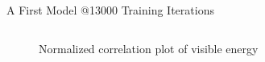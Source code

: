 \begin{frame}{A First Model @13000 Training Iterations}
\begin{columns}
\begin{column}{.65\textwidth}
\begin{figure}
{                    \caption*{\small Normalized correlation plot of visible energy}
                }
            \end{figure}
        \end{column}
    \end{columns}
\end{frame}
